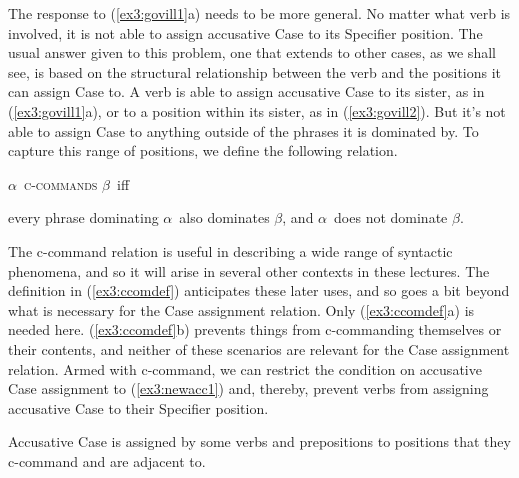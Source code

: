 The response to (\ref{ex3:govill1}a) needs to be more general. No matter what verb is involved, it is not able to assign accusative Case to its Specifier position. The usual answer given to this problem, one that extends to other cases, as we shall see, is based on the structural relationship between the verb and the positions it can assign Case to. A verb is able to assign accusative Case to its sister, as in (\ref{ex3:govill1}a), or to a position within its sister, as in (\ref{ex3:govill2}). But it's not able to assign Case to anything outside of the phrases it is dominated by. To capture this range of positions, we define the following relation.
\begin{exe}
\ex \label{ex3:ccomdef} $\alpha$\ \textsc{c-commands} $\beta$\ iff 
\begin{xlist}
	\ex every phrase dominating $\alpha$\ also dominates $\beta$, and
	\ex $\alpha$\ does not dominate $\beta$.
\end{xlist}
\end{exe}
The c-command relation is useful in describing a wide range of syntactic phenomena, and so it will arise in several other contexts in these lectures. The definition in (\ref{ex3:ccomdef}) anticipates these later uses, and so goes a bit beyond what is necessary for the Case assignment relation. Only (\ref{ex3:ccomdef}a) is needed here. (\ref{ex3:ccomdef}b) prevents things from c-commanding themselves or their contents, and neither of these scenarios are relevant for the Case assignment relation. Armed with c-command, we can restrict the condition on accusative Case assignment to (\ref{ex3:newacc1}) and, thereby, prevent verbs from assigning accusative Case to their Specifier position.
\begin{exe}
\ex \label{ex3:newacc1} Accusative Case is assigned by some verbs and prepositions to positions that they c-command and are adjacent to.
\end{exe}

